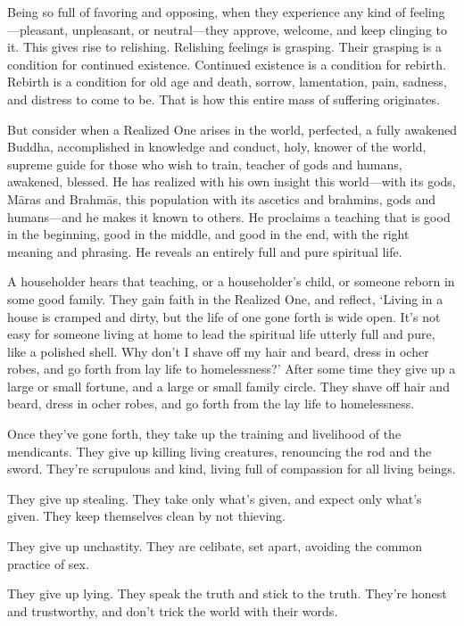 \documentclass[12pt,openany]{book}%
\begin{document}
Being so full of favoring and opposing, when they experience any kind of feeling—pleasant, unpleasant, or neutral—they approve, welcome, and keep clinging to it. This gives rise to relishing. Relishing feelings is grasping. Their grasping is a condition for continued existence. Continued existence is a condition for rebirth. Rebirth is a condition for old age and death, sorrow, lamentation, pain, sadness, and distress to come to be. That is how this entire mass of suffering originates. 

But consider when a Realized One arises in the world, perfected, a fully awakened Buddha, accomplished in knowledge and conduct, holy, knower of the world, supreme guide for those who wish to train, teacher of gods and humans, awakened, blessed. He has realized with his own insight this world—with its gods, \textsanskrit{Māras} and \textsanskrit{Brahmās}, this population with its ascetics and brahmins, gods and humans—and he makes it known to others. He proclaims a teaching that is good in the beginning, good in the middle, and good in the end, with the right meaning and phrasing. He reveals an entirely full and pure spiritual life. 

A householder hears that teaching, or a householder’s child, or someone reborn in some good family. They gain faith in the Realized One, and reflect, ‘Living in a house is cramped and dirty, but the life of one gone forth is wide open. It’s not easy for someone living at home to lead the spiritual life utterly full and pure, like a polished shell. Why don’t I shave off my hair and beard, dress in ocher robes, and go forth from lay life to homelessness?’ After some time they give up a large or small fortune, and a large or small family circle. They shave off hair and beard, dress in ocher robes, and go forth from the lay life to homelessness. 

Once they’ve gone forth, they take up the training and livelihood of the mendicants. They give up killing living creatures, renouncing the rod and the sword. They’re scrupulous and kind, living full of compassion for all living beings. 

They give up stealing. They take only what’s given, and expect only what’s given. They keep themselves clean by not thieving. 

They give up unchastity. They are celibate, set apart, avoiding the common practice of sex. 

They give up lying. They speak the truth and stick to the truth. They’re honest and trustworthy, and don’t trick the world with their words. 
\end{document}
